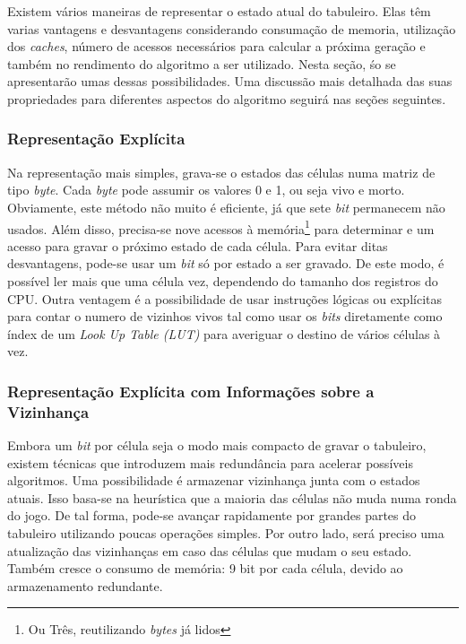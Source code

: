 Existem vários maneiras de representar o estado atual do tabuleiro. Elas têm varias vantagens e desvantagens considerando consumação de memoria, utilização dos \textit{caches}, número de acessos necessários para calcular a próxima geração e também no rendimento do algoritmo a ser utilizado. Nesta seção, śo se apresentarão umas dessas possibilidades. Uma discussão mais detalhada das suas propriedades para diferentes aspectos do algoritmo seguirá nas seções seguintes.\\

\subsubsection{Representação Explícita}
Na representação mais simples, grava-se o estados das células numa matriz de tipo \textit{byte}. Cada \textit{byte} pode assumir os valores 0 e 1, ou seja vivo e morto. Obviamente, este método não muito é eficiente, já que sete \textit{bit} permanecem não usados. Além disso, precisa-se nove acessos à memória\footnote{Ou Três, reutilizando \textit{bytes} já lidos} para determinar e um acesso para gravar o próximo estado de cada célula. Para evitar ditas desvantagens, pode-se usar um \textit{bit} só por estado a ser gravado. De este modo, é possível ler mais que uma célula vez, dependendo do tamanho dos registros do CPU. Outra ventagem é a possibilidade de usar instruções lógicas ou explícitas para contar o numero de vizinhos vivos tal como usar os \textit{bits} diretamente como índex de um \textit{Look Up Table (LUT)} para averiguar o destino de vários células à vez.\\

\subsubsection{Representação Explícita com Informações sobre a Vizinhança}
Embora um \textit{bit} por célula seja o modo mais compacto de gravar o tabuleiro, existem técnicas que introduzem mais redundância para acelerar possíveis algoritmos. Uma possibilidade é armazenar vizinhança junta com o estados atuais. Isso basa-se na heurística que a maioria das células não muda numa ronda do jogo. De tal forma, pode-se avançar rapidamente por grandes partes do tabuleiro utilizando poucas operações simples. Por outro lado, será preciso uma atualização das vizinhanças em caso das células que mudam o seu estado. Também cresce o consumo de memória: 9 bit por cada célula, devido ao armazenamento redundante.\\


